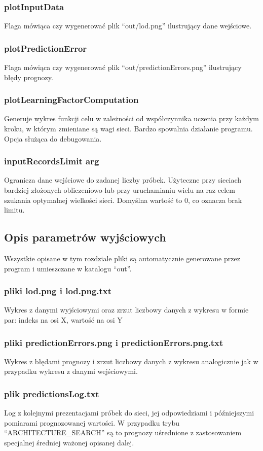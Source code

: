 \documentclass[12pt,a4]{article}
\begin{document}
\subsubsection{plotInputData} Flaga mówiąca czy wygenerować plik ``out/lod.png'' ilustrujący dane wejściowe.
\subsubsection{plotPredictionError} Flaga mówiąca czy wygenerować plik ``out/predictionErrors.png'' 
ilustrujący błędy prognozy.
\subsubsection{plotLearningFactorComputation} Generuje wykres funkcji celu w zależności od współczynnika uczenia przy 
każdym kroku, w którym zmieniane są wagi sieci. Bardzo spowalnia działanie programu. Opcja służąca do debugowania.
\subsubsection{inputRecordsLimit arg} Ogranicza dane wejściowe do zadanej liczby próbek. Użyteczne przy sieciach
bardziej złożonych obliczeniowo lub przy uruchamianiu wielu na raz celem szukania optymalnej wielkości sieci.
Domyślna wartość to 0, co oznacza brak limitu.

\subsection{Opis parametrów wyjściowych}
Wszystkie opisane w tym rozdziale pliki są automatycznie generowane przez program i umieszczane w katalogu ``out''.
\subsubsection{pliki lod.png i lod.png.txt} Wykres z danymi wyjściowymi oraz zrzut liczbowy danych z wykresu w 
formie par: indeks na osi X, wartość na osi Y
\subsubsection{pliki predictionErrors.png i predictionErrors.png.txt} Wykres z błędami prognozy i zrzut liczbowy 
danych z wykresu analogicznie jak w przypadku wykresu z danymi wejściowymi.
\subsubsection{plik predictionsLog.txt} Log z kolejnymi prezentacjami próbek do sieci, jej odpowiedziami i późniejszymi
pomiarami prognozowanej wartości. W przypadku trybu ``ARCHITECTURE\_SEARCH'' są to prognozy uśrednione z zastosowaniem
specjalnej średniej ważonej opisanej dalej.
\end{document}
